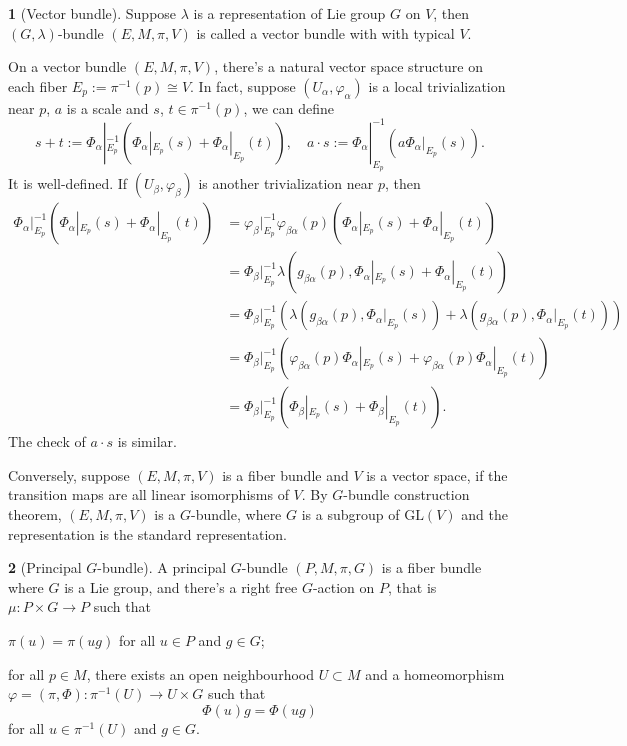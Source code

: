 \documentclass[11pt]{article}
\theoremstyle{definition}
\newtheorem{para}{}[part]
\theoremstyle{plain}
\begin{document}
\begin{para}[Vector bundle]
	Suppose $\lambda$ is a representation of Lie group $G$ on $V$, then $(G,\lambda)$-bundle $(E,M,\pi,V)$ is called a vector bundle with with typical $V$.

	On a vector bundle $(E,M,\pi,V)$, there's a natural vector space structure on each fiber $E_p:=\pi^{-1}(p)\cong V$. In fact, suppose $(U_\alpha,\varphi_\alpha)$ is a local trivialization near $p$, $a$ is a scale and $s$, $t\in \pi^{-1}(p)$, we can define
	\[
	s+t:=\Phi_{\alpha}|_{E_p}^{-1}\left(\Phi_{\alpha}|_{E_p}(s)+\Phi_{\alpha}|_{E_p}(t)\right),\quad a\cdot s:=\Phi_{\alpha}|_{E_p}^{-1}\left(a\Phi_{\alpha}|_{E_p}(s)\right).
	\]
	It is well-defined. If $(U_\beta,\varphi_\beta)$ is another trivialization near $p$, then
	\[
	\begin{aligned}
	\Phi_{\alpha}|_{E_p}^{-1}\left(\Phi_{\alpha}|_{E_p}(s)+\Phi_{\alpha}|_{E_p}(t)\right)&=\varphi_\beta|_{E_p}^{-1}\varphi_{\beta\alpha}(p)\left(\Phi_{\alpha}|_{E_p}(s)+\Phi_{\alpha}|_{E_p}(t)\right)\\
	&=\Phi_\beta|_{E_p}^{-1}\lambda\left(g_{\beta\alpha}(p),\Phi_{\alpha}|_{E_p}(s)+\Phi_{\alpha}|_{E_p}(t)\right)\\
	&=\Phi_\beta|_{E_p}^{-1}\left(\lambda\left(g_{\beta\alpha}(p),\Phi_{\alpha}|_{E_p}(s)\right)+\lambda\left(g_{\beta\alpha}(p),\Phi_{\alpha}|_{E_p}(t)\right)\right)\\
	&=\Phi_\beta|_{E_p}^{-1}\left(\varphi_{\beta\alpha}(p)\Phi_{\alpha}|_{E_p}(s)+\varphi_{\beta\alpha}(p)\Phi_{\alpha}|_{E_p}(t)\right)\\
	&=\Phi_\beta|_{E_p}^{-1}\left(\Phi_{\beta}|_{E_p}(s)+\Phi_{\beta}|_{E_p}(t)\right).
	\end{aligned}
	\]
	The check of $a\cdot s$ is similar.

	Conversely, suppose $(E,M,\pi,V)$ is a fiber bundle and $V$ is a vector space, if the transition maps are all linear isomorphisms of $V$. By $G$-bundle construction theorem, $(E,M,\pi,V)$ is a $G$-bundle, where $G$ is a subgroup of $\mathrm{GL}(V)$ and the representation is the standard representation.
\end{para}

\begin{para}[Principal $G$-bundle]
A principal $G$-bundle $(P,M,\pi,G)$ is a fiber bundle where $G$ is a Lie group, and there's a right free $G$-action on $P$, that is $\mu:P\times G\to P$ such that
\begin{compactenum}
	\item $\pi(u)=\pi(ug)$ for all $u\in P$ and $g\in G$;
	\item for all $p\in M$, there exists an open neighbourhood $U\subset M$ and a homeomorphism $\varphi=(\pi,\Phi):\pi^{-1}(U)\to U\times G$ such that
	\[
	\Phi(u)g=\Phi(ug)
	\]
	for all $u\in \pi^{-1}(U)$ and $g\in G$.
\end{compactenum}
\end{para}
\end{document}
